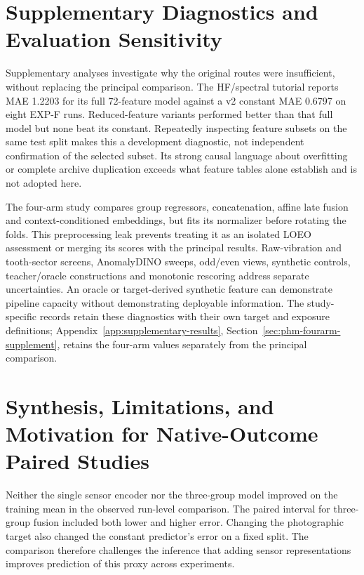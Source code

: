 \section{Supplementary Diagnostics and Evaluation Sensitivity}
\label{sec:phm-diagnostics}
Supplementary analyses investigate why the original routes were insufficient, without
replacing the principal comparison. The HF/spectral tutorial reports MAE 1.2203 for its
full 72-feature model against a v2 constant MAE 0.6797 on eight EXP-F runs.
Reduced-feature variants performed better than that full model but none beat its
constant. Repeatedly inspecting feature subsets on the same test split makes this a
development diagnostic, not independent confirmation of the selected subset. Its strong
causal language about overfitting or complete archive duplication exceeds what feature
tables alone establish and is not adopted here.

The four-arm study compares group regressors, concatenation, affine late fusion and
context-conditioned embeddings, but fits its normalizer before rotating the folds.
This preprocessing leak prevents treating it as an isolated LOEO assessment or merging
its scores with the principal results. Raw-vibration and tooth-sector screens, AnomalyDINO
sweeps, odd/even views, synthetic controls, teacher/oracle constructions and monotonic
rescoring address separate uncertainties. An oracle or target-derived synthetic feature
can demonstrate pipeline capacity without demonstrating deployable information. The
study-specific records retain these diagnostics with their own target and exposure
definitions; Appendix~\ref{app:supplementary-results}, Section~\ref{sec:phm-fourarm-supplement},
retains the four-arm values separately from the principal comparison.

\section{Synthesis, Limitations, and Motivation for Native-Outcome Paired Studies}
Neither the single sensor encoder nor the three-group model improved on the training
mean in the observed run-level comparison. The paired interval for three-group fusion
included both lower and higher error. Changing the photographic target also changed the
constant predictor's error on a fixed split. The comparison therefore challenges the
inference that adding sensor representations improves prediction of this proxy across
experiments.

